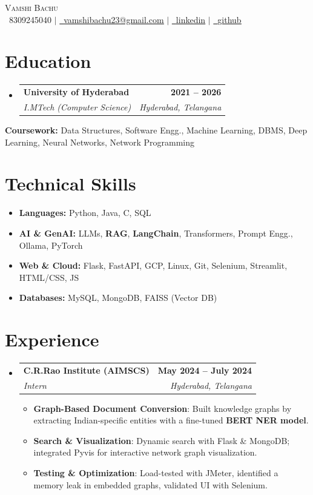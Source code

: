 \documentclass[letterpaper,10.8pt]{article}
\makeatletter
\newcommand{\resumeItem}[1]{
  \item\small{#1 \vspace{-1pt}}
}
\newcommand{\resumeSubheading}[4]{
  \vspace{-2pt}\item
    \begin{tabular*}{1.0\textwidth}[t]{l@{\extracolsep{\fill}}r}
      \textbf{\color{accent}#1} & \textbf{\small #2} \\
      \textit{\small\color{subtle}#3} & \textit{\small\color{subtle}#4} \\
    \end{tabular*}\vspace{-7pt}
}
\newcommand{\resumeSubHeadingListStart}{\begin{itemize}[leftmargin=0.0in, label={}]}
\newcommand{\resumeSubHeadingListEnd}{\end{itemize}\vspace{-5pt}}
\newcommand{\resumeItemListStart}{\begin{itemize}[itemsep=1pt, topsep=0pt, leftmargin=0.15in]}
\newcommand{\resumeItemListEnd}{\end{itemize}\vspace{-5pt}}
\makeatother
\begin{document}
\begin{center}
    {\Huge\scshape\color{accent}Vamshi Bachu} \\ \vspace{4pt}
    \small
    \raisebox{-0.1\height}\faPhone\ 8309245040 \enspace$|$\enspace
    \href{mailto:vamshibachu23@gmail.com}{\raisebox{-0.2\height}\faEnvelope\ \underline{vamshibachu23@gmail.com}} \enspace$|$\enspace
    \href{https://linkedin.com/in/vamshi-bachu-18a706256/}{\raisebox{-0.2\height}\faLinkedin\ \underline{linkedin}} \enspace$|$\enspace
    \href{https://github.com/Vamshi9415}{\raisebox{-0.2\height}\faGithub\ \underline{github}}
    \vspace{-8pt}
\end{center}

\section{Education}
\resumeSubHeadingListStart
\resumeSubheading
  {University of Hyderabad}{2021 -- 2026}
  {I.MTech (Computer Science)}{Hyderabad, Telangana}
\resumeSubHeadingListEnd
\vspace{-4pt}
\small\textbf{Coursework:} Data Structures, Software Engg., Machine Learning, DBMS, Deep Learning, Neural Networks, Network Programming
\vspace{-4pt}

\section{Technical Skills}
\begin{itemize}[leftmargin=0.15in, label={}, itemsep=-2pt]
  \small\item \textbf{Languages:} Python, Java, C, SQL
  \small\item \textbf{AI \& GenAI:} LLMs, \textbf{RAG}, \textbf{LangChain}, Transformers, Prompt Engg., Ollama, PyTorch
  \small\item \textbf{Web \& Cloud:} Flask, FastAPI, GCP, Linux, Git, Selenium, Streamlit, HTML/CSS, JS
  \small\item \textbf{Databases:} MySQL, MongoDB, FAISS (Vector DB)
\end{itemize}
\vspace{-12pt}

\section{Experience}
\resumeSubHeadingListStart
\resumeSubheading
  {C.R.Rao Institute (AIMSCS)}{May 2024 -- July 2024}
  {Intern}{Hyderabad, Telangana}
\resumeItemListStart
  \resumeItem{\textbf{Graph-Based Document Conversion}: Built knowledge graphs by extracting Indian-specific entities with a fine-tuned \textbf{BERT NER model}.}
  \resumeItem{\textbf{Search \& Visualization}: Dynamic search with Flask \& MongoDB; integrated Pyvis for interactive network graph visualization.}
  \resumeItem{\textbf{Testing \& Optimization}: Load-tested with JMeter, identified a memory leak in embedded graphs, validated UI with Selenium.}
\resumeItemListEnd
\resumeSubHeadingListEnd
\end{document}
